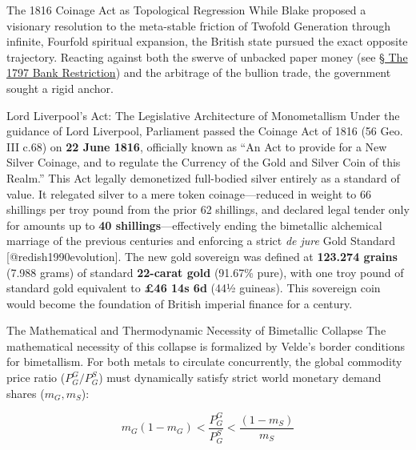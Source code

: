 \documentclass[
  ignorenonframetext,
]{beamer}
\author{\texorpdfstring{}{}}
\date{}
\begin{document}
\begin{frame}{The 1816 Coinage Act as Topological Regression}
\protect{}\label{sec-coinage-act-1816}
While Blake proposed a visionary resolution to the meta-stable friction
of Twofold Generation through infinite, Fourfold spiritual expansion,
the British state pursued the exact opposite trajectory. Reacting
against both the swerve of unbacked paper money (see
\hyperlink{sec-bank-restriction-1797}{§ The 1797 Bank Restriction}) and
the arbitrage of the bullion trade, the government sought a rigid
anchor.

\begin{block}{Lord Liverpool's Act: The Legislative Architecture of
Monometallism}
\protect{}\label{lord-liverpools-act-the-legislative-architecture-of-monometallism}
Under the guidance of Lord Liverpool, Parliament passed the Coinage Act
of 1816 (56 Geo. III c.68) on \textbf{22 June 1816}, officially known as
``An Act to provide for a New Silver Coinage, and to regulate the
Currency of the Gold and Silver Coin of this Realm.'' This Act legally
demonetized full-bodied silver entirely as a standard of value. It
relegated silver to a mere token coinage---reduced in weight to 66
shillings per troy pound from the prior 62 shillings, and declared legal
tender only for amounts up to \textbf{40 shillings}---effectively ending
the bimetallic alchemical marriage of the previous centuries and
enforcing a strict \emph{de jure} Gold Standard
{[}@redish1990evolution{]}. The new gold sovereign was defined at
\textbf{123.274 grains} (7.988 grams) of standard \textbf{22-carat gold}
(91.67\% pure), with one troy pound of standard gold equivalent to
\textbf{£46 14s 6d} (44½ guineas). This sovereign coin would become the
foundation of British imperial finance for a century.
\end{block}

\begin{block}{The Mathematical and Thermodynamic Necessity of Bimetallic
Collapse}
\protect{}\label{the-mathematical-and-thermodynamic-necessity-of-bimetallic-collapse}
The mathematical necessity of this collapse is formalized by Velde's
border conditions for bimetallism. For both metals to circulate
concurrently, the global commodity price ratio (\(P_G^G / P_G^S\)) must
dynamically satisfy strict world monetary demand shares (\(m_G, m_S\)):

\begin{equation}
\label{eq:velde_demand_shares}
m_G (1 - m_G) < \frac{P_G^G}{P_G^S} < \frac{(1 - m_S)}{m_S}
\end{equation}


\end{block}
\end{frame}
\end{document}

